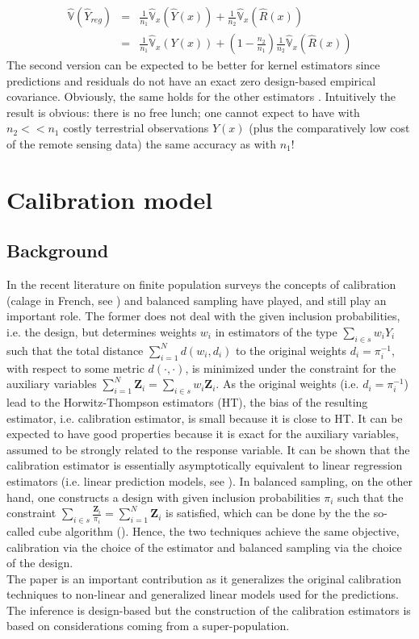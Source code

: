 \documentclass[a4paper,12pt,leqno, titlepage]{article}
\newcommand{\VAR}{\mathbb{V}}
\begin{document}
\begin{appendix}
\begin{eqnarray}\label{classicalexternalvar}
\hat{\VAR}(\hat{Y}_{reg})&=&\frac{1}{n_1}\hat{\VAR}_x(\hat{Y}(x))+ \frac{1}{n_2}\hat{\VAR}_x(\hat{R }(x)) \nonumber\\
&=& \frac{1}{n_1}\hat{\VAR}_x(Y(x))+ (1-\frac{n_2}{n_1})\frac{1}{n_2}\hat{\VAR}_x(\hat{R}(x))
\end{eqnarray}
The second version can be expected to be better for kernel estimators since predictions and residuals do not have an exact zero design-based empirical covariance. Obviously, the same holds for the other estimators . Intuitively the result is obvious: there is no free lunch; one cannot expect to have with $n_2<<n_1$ costly terrestrial observations $Y(x)$ (plus the comparatively low cost of the remote sensing data) the same accuracy as with $n_1$!
\clearpage \newpage
\section{Calibration model}\label{calibration}
\subsection{Background}
In the recent literature on finite population surveys the concepts of calibration (calage in French, see \cite{tille1}) and balanced sampling have played, and still play an important role. The former does not deal with the given inclusion probabilities, i.e. the design, but determines weights $w_i$ in estimators of the type $\sum_{i\in{s}}w_iY_i$ such that the total distance $\sum_{i=1}^N d(w_i,d_i)$ to the original weights $d_i=\pi_i^{-1}$, with respect to some metric $d(\cdot,\cdot)$, is minimized under the constraint for the auxiliary variables $\sum_{i=1}^N \pmb{Z}_i=\sum_{i\in{s}}w_i\pmb{Z}_i$. As the original weights (i.e. $d_i=\pi_i^{-1}$) lead to the Horwitz-Thompson estimators (HT), the bias of the resulting estimator, i.e. calibration estimator, is small because it is close to HT. It can be expected to have good properties because it is exact for the auxiliary variables, assumed to be strongly related to the response variable. It can be shown that the calibration estimator is essentially asymptotically equivalent to linear regression estimators (i.e. linear prediction models, see \cite{sarndaldeville1}). In balanced sampling, on the other hand, one constructs a design with given inclusion probabilities $\pi_i$ such that the constraint $\sum_{i\in{s}}\frac{\pmb{Z}_i}{\pi_i}=\sum_{i=1}^N\pmb{Z}_i$ is satisfied, which can be done by the the so-called cube algorithm (\cite{tille2}). Hence, the two techniques achieve the same objective, calibration via the choice of the estimator and balanced sampling via the choice of the design. \\
  The paper \cite{wusitter1} is an important contribution as it generalizes the original calibration techniques to non-linear and generalized linear models used for the predictions. The inference is design-based but the construction of the calibration estimators is based on considerations coming from a super-population.

\end{appendix}
\end{document}
